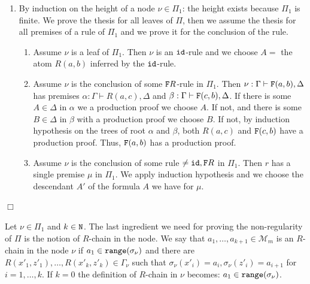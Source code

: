 \documentclass[a4paper,12pt]{article}
\newenvironment{proof}[1][Proof]{\begin{trivlist}
\item[\hskip \labelsep {\bfseries #1}]}{\end{trivlist}}
\newcommand{\setM}              { {\mathcal M} }
\newcommand{\Nat}               { {\tt N}  }
\newcommand{\Forward}         { {\tt F} }
\newcommand{\id}              { {\tt id} }
\newcommand{\range}           { {\tt range} }
\begin{document}
\begin{proof}
\begin{enumerate}
\begin{enumerate}
Assume $\Forward R$ has two premises $\alpha, \beta$, and auxiliary formulas $R(a'',c'')$ and $\Forward(c'',b'')$, with $a'=a''$, $b'=b''$ true in $\sigma_\alpha$ and $\sigma_\beta$. By induction on $\alpha, \beta$ we have $\sigma_\alpha, \setM_m \models R(a'',c'')$ and $\sigma_\beta, \setM_m \models \Forward(c'',b'')$, hence $\sigma_\mu, \setM_m \models \Forward(a',b')$, as wished. 
\end{enumerate}

\item
By induction on the height of a node $\nu \in \Pi_1$: the height exists  because $\Pi_1$ is finite. We prove the thesis for all leaves of $\Pi$, then we assume the thesis for all premises of a rule of $\Pi_1$ and we prove it for the conclusion of the rule.
\begin{enumerate}
\item
Assume $\nu$ is a leaf of $\Pi_1$. Then $\nu$ is an $\id$-rule and we choose $A = $ the atom $R(a,b)$ inferred by the $\id$-rule. 
\item
Assume $\nu$ is the conclusion of some $\Forward R$-rule in $\Pi_1$. Then $\nu: \Gamma \vdash \Forward(a,b),\Delta$ has premises $\alpha: \Gamma \vdash R(a,c),\Delta$ and $\beta:\Gamma \vdash \Forward(c,b),\Delta$. If there is some $A \in \Delta$ in $\alpha$ we a production proof we choose $A$. If not, and there is some $B \in \Delta$ in $\beta$ with a production proof we choose $B$. If not, by induction hypothesis on the trees of root $\alpha$ and $\beta$, both $R(a,c)$ and  $\Forward(c,b)$ have a production proof. Thus, $\Forward(a,b)$ has a production proof.
\item
Assume $\nu$ is the conclusion of some rule $\not = \id, \Forward R$ in $\Pi_1$. Then $r$ has a single premise $\mu$ in $\Pi_1$. We apply induction hypothesis and we choose the descendant $A'$ of the formula $A$ we have for $\mu$. 
\end{enumerate}
\end{enumerate}
$\Box$
\end{proof}




Let $\nu \in \Pi_1$ and $k \in \Nat$. The last ingredient we need for proving the non-regularity of $\Pi$ is the notion of $R$-chain in the node. We say that $a_1, \ldots, a_{k+1} \in \setM_m$ is an $R$-chain in the node $\nu$ if $a_1 \in \range(\sigma_\nu)$ and there are $R(x'_1, z'_1), \ldots, R(x'_k, z'_k) \in \Gamma_\nu$ such that $\sigma_\nu(x'_i)=a_i, \sigma_\nu(z'_i)=a_{i+1}$ for $i=1, \ldots, k$. 
If $k=0$ the definition of $R$-chain in $\nu$ becomes: $a_1 \in \range(\sigma_\nu)$. 
\end{document}
